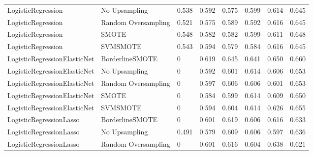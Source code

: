 \begin{tabular}{llllllll}
          LogisticRegression &       No Upsampling & 0.538 &                     0.592 &                 0.575 &                  0.599 &                                   0.614 &    0.645 \\
          LogisticRegression & Random Oversampling & 0.521 &                     0.575 &                 0.589 &                  0.592 &                                   0.616 &    0.645 \\
          LogisticRegression &               SMOTE & 0.548 &                     0.582 &                 0.582 &                  0.599 &                                   0.611 &    0.648 \\
          LogisticRegression &            SVMSMOTE & 0.543 &                     0.594 &                 0.579 &                  0.584 &                                   0.616 &    0.645 \\
LogisticRegressionElasticNet &     BorderlineSMOTE &     0 &                     0.619 &                 0.645 &                  0.641 &                                   0.650 &    0.660 \\
LogisticRegressionElasticNet &       No Upsampling &     0 &                     0.592 &                 0.601 &                  0.614 &                                   0.606 &    0.653 \\
LogisticRegressionElasticNet & Random Oversampling &     0 &                     0.597 &                 0.606 &                  0.606 &                                   0.601 &    0.653 \\
LogisticRegressionElasticNet &               SMOTE &     0 &                     0.584 &                 0.599 &                  0.614 &                                   0.609 &    0.650 \\
LogisticRegressionElasticNet &            SVMSMOTE &     0 &                     0.594 &                 0.604 &                  0.614 &                                   0.626 &    0.655 \\
     LogisticRegressionLasso &     BorderlineSMOTE &     0 &                     0.601 &                 0.619 &                  0.606 &                                   0.616 &    0.633 \\
     LogisticRegressionLasso &       No Upsampling & 0.491 &                     0.579 &                 0.609 &                  0.606 &                                   0.597 &    0.636 \\
     LogisticRegressionLasso & Random Oversampling &     0 &                     0.601 &                 0.616 &                  0.604 &                                   0.638 &    0.621 \\

\end{tabular}

